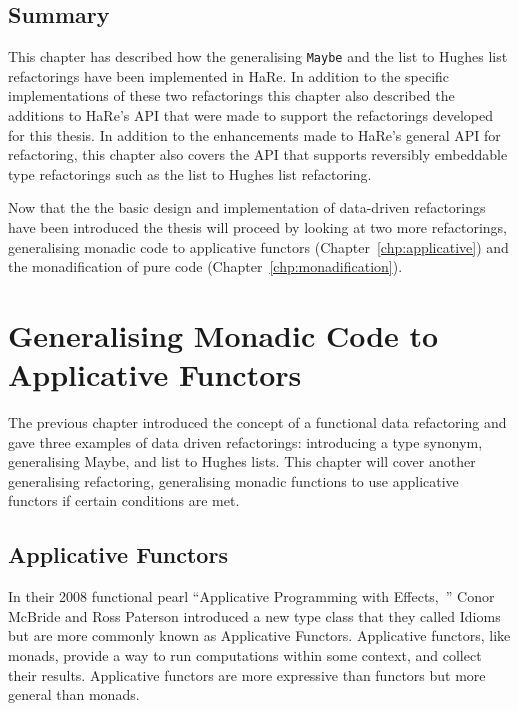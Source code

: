 \section{Summary}

This chapter has described how the generalising \texttt{Maybe} and the list to Hughes list refactorings have been implemented in HaRe. In addition to the specific implementations  of these two refactorings this chapter also described the additions to HaRe's API that were made to support the refactorings developed for this thesis. In addition to the enhancements made to HaRe's general API for refactoring, this chapter also covers the API that supports reversibly embeddable type refactorings such as the list to Hughes list refactoring.

Now that the the basic design and implementation of data-driven refactorings have been introduced the thesis will proceed by looking at two more refactorings, generalising monadic code to applicative functors (Chapter~\ref{chp:applicative}) and the monadification of pure code (Chapter~\ref{chp:monadification}).



\chapter{Generalising Monadic Code to Applicative Functors}
\label{chp:applicative}

The previous chapter introduced the concept of a functional data refactoring and gave three examples of data driven refactorings: introducing a type synonym, generalising Maybe, and list to Hughes lists. This chapter will cover another generalising refactoring, generalising monadic functions to use applicative functors if certain conditions are met. 

\section{Applicative Functors}

In their 2008 functional pearl ``Applicative Programming with Effects,~\citep{mcbrideIdioms}'' Conor McBride and Ross Paterson introduced a new type class that they called Idioms but are more commonly known as Applicative Functors. Applicative functors, like monads, provide a way to run computations within some context, and collect their results. Applicative functors are more expressive than functors but more general than monads. 

